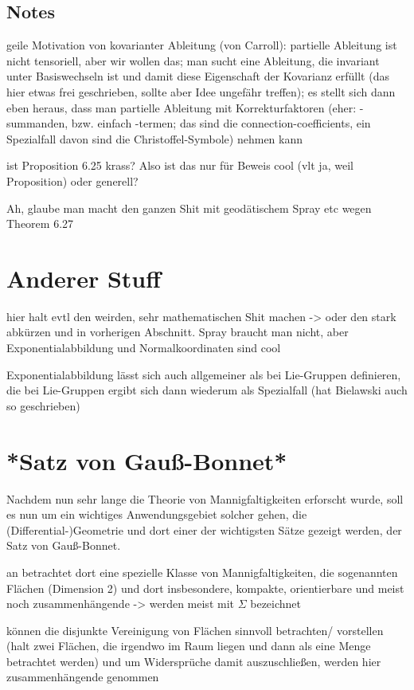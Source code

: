 \documentclass[../H_Analysis_main.tex]{subfiles}
\begin{document}
		\subsection{Notes}

geile Motivation von kovarianter Ableitung (von Carroll): partielle Ableitung ist nicht tensoriell, aber wir wollen das; man sucht eine Ableitung, die invariant unter Basiswechseln ist und damit diese Eigenschaft der Kovarianz erfüllt (das hier etwas frei geschrieben, sollte aber Idee ungefähr treffen); es stellt sich dann eben heraus, dass man partielle Ableitung mit Korrekturfaktoren (eher: -summanden, bzw. einfach -termen; das sind die connection-coefficients, ein Spezialfall davon sind die Christoffel-Symbole) nehmen kann



ist Proposition 6.25 krass? Also ist das nur für Beweis cool (vlt ja, weil Proposition) oder generell?


Ah, glaube man macht den ganzen Shit mit geodätischem Spray etc wegen Theorem 6.27


\newpage


	\section{Anderer Stuff}
hier halt evtl den weirden, sehr mathematischen Shit machen -> oder den stark abkürzen und in vorherigen Abschnitt. Spray braucht man nicht, aber Exponentialabbildung und Normalkoordinaten sind cool

Exponentialabbildung lässt sich auch allgemeiner als bei Lie-Gruppen definieren, die bei Lie-Gruppen ergibt sich dann wiederum als Spezialfall (hat Bielawski auch so geschrieben)


\newpage


	\section{*Satz von Gauß-Bonnet*}
Nachdem nun sehr lange die Theorie von Mannigfaltigkeiten erforscht wurde, soll es nun um ein wichtiges Anwendungsgebiet solcher gehen, die (Differential-)Geometrie und dort einer der wichtigsten Sätze gezeigt werden, der Satz von Gauß-Bonnet.


an betrachtet dort eine spezielle Klasse von Mannigfaltigkeiten, die sogenannten Flächen (Dimension 2) und dort insbesondere, kompakte, orientierbare und meist noch zusammenhängende -> werden meist mit $\Sigma$ bezeichnet

können die disjunkte Vereinigung von Flächen sinnvoll betrachten/ vorstellen (halt zwei Flächen, die irgendwo im Raum liegen und dann als eine Menge betrachtet werden) und um Widersprüche damit auszuschließen, werden hier zusammenhängende genommen
\end{document}
